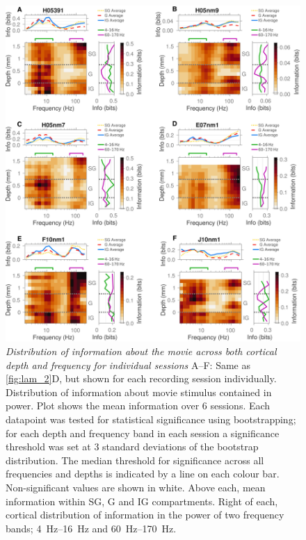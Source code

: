 \begin{figure}
\centering \includegraphics[width=\columnwidth]{paperfigs/figS2}
%
\caption{%
\textit{Distribution of information about the movie across both cortical depth and frequency for individual sessions}
A--F: Same as \autoref{fig:lam_2}D, but shown for each recording session individually.
Distribution of information about movie stimulus contained in power.
Plot shows the mean information over 6 sessions.
Each datapoint was tested for statistical significance using bootstrapping; for each depth and frequency band in each session a significance threshold was set at 3 standard deviations of the bootstrap distribution.
The median threshold for significance across all frequencies and depths is indicated by a line on each colour bar.
Non-significant values are shown in white.
Above each, mean information within \ac{SG}, \ac{G} and \ac{IG} compartments.
Right of each, cortical distribution of information in the power of two frequency bands; \SIrange{4}{16}{Hz} and \SIrange{60}{170}{Hz}.
}
\label{fig:lam_s2}
%
\end{figure}


